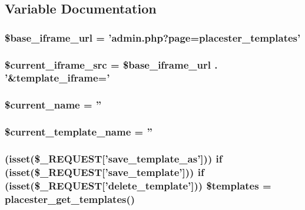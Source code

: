 \subsection{Variable Documentation}
\hypertarget{templates_8php_a3c5dba6f7237d5d2286c177ae89e5d71}{
\subsubsection[{\$base\_\-iframe\_\-url}]{\setlength{\rightskip}{0pt plus 5cm}\$base\_\-iframe\_\-url = 'admin.php?page=placester\_\-templates'}}
\label{dd/db0/templates_8php_a3c5dba6f7237d5d2286c177ae89e5d71}
\hypertarget{templates_8php_a82a47bfb0d30eef92537f3833f9a0fb4}{
\subsubsection[{\$current\_\-iframe\_\-src}]{\setlength{\rightskip}{0pt plus 5cm}\$current\_\-iframe\_\-src = \$base\_\-iframe\_\-url . '\&template\_\-iframe='}}
\label{dd/db0/templates_8php_a82a47bfb0d30eef92537f3833f9a0fb4}
\hypertarget{templates_8php_aeb3b3063588b48b25fc5833245f12067}{
\subsubsection[{\$current\_\-name}]{\setlength{\rightskip}{0pt plus 5cm}\$current\_\-name = ''}}
\label{dd/db0/templates_8php_aeb3b3063588b48b25fc5833245f12067}
\hypertarget{templates_8php_a5b5bec8b632991a1b30093383b29efdd}{
\subsubsection[{\$current\_\-template\_\-name}]{\setlength{\rightskip}{0pt plus 5cm}\$current\_\-template\_\-name = ''}}
\label{dd/db0/templates_8php_a5b5bec8b632991a1b30093383b29efdd}
\hypertarget{templates_8php_a29344aedac519f2779920e863d0c6214}{
\subsubsection[{\$templates}]{ (isset(\$\_\-REQUEST\mbox{[}'save\_\-template\_\-as'\mbox{]})) {\bf if} (isset(\$\_\-REQUEST\mbox{[}'save\_\-template'\mbox{]})) {\bf if} (isset(\$\_\-REQUEST\mbox{[}'delete\_\-template'\mbox{]})) \$templates = placester\_\-get\_\-templates()}}
